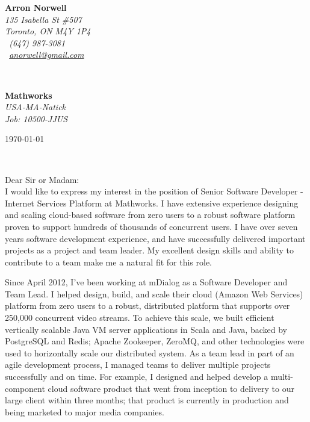 \documentclass[11pt]{article}
\begin{document}
\sffamily   %
\hfill%
\begin{minipage}[t]{.6\textwidth}
\raggedleft%
{\bfseries Arron Norwell}\\[.35ex]
\small\itshape%
135 Isabella St \#507\\
Toronto, ON M4Y 1P4\\[.35ex]
\Telefon~(647) 987-3081\\
\Letter~\href{mailto:anorwell@gmail.com}{anorwell@gmail.com}
\end{minipage}\\[1em]
%
\begin{minipage}[t]{.4\textwidth}
\raggedright%
{\bfseries Mathworks}\\[.35ex]
\small\itshape%
USA-MA-Natick \\
Job: 10500-JJUS
\end{minipage}
\hfill %
\begin{minipage}[t]{.4\textwidth}
\raggedleft %
\today
\end{minipage}\\[2em]
\raggedright
Dear Sir or Madam:\\[1.5em]
%
I would like to express my interest in the position of Senior Software Developer - Internet Services Platform at Mathworks. I have extensive experience designing and scaling cloud-based software from zero users to a robust software platform proven to support hundreds of thousands of concurrent users. I have over seven years software development experience, and have successfully delivered important projects as a project and team leader. My excellent design skills and ability to contribute to a team make me a natural fit for this role.

Since April 2012, I’ve been working at mDialog as a Software Developer and Team Lead. I helped design, build, and scale their cloud (Amazon Web Services)  platform from zero users to a robust, distributed platform that supports over 250,000 concurrent video streams. To achieve this scale, we built efficient vertically scalable Java VM server applications in Scala and Java, backed by PostgreSQL and Redis; Apache Zookeeper, ZeroMQ, and other technologies were used to horizontally scale our distributed system. As a team lead in part of an agile development process, I managed teams to deliver multiple projects successfully and on time. For example, I designed and helped develop a multi-component cloud software product that went from inception to delivery to our large client within three months; that product is currently in production and being marketed to major media companies.
\end{document}
